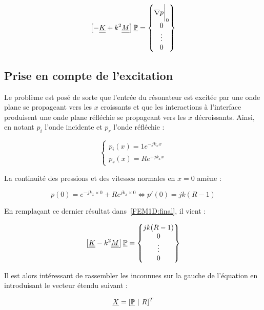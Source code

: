 \begin{equation}
\left[- \underline{\underline{K}} + k^2\underline{\underline{M}}\right]\underline{\mathbb{P}} = \begin{Bmatrix} \nabla p\bigg|_0\\0\\\vdots\\0\end{Bmatrix}
	\label{FEM1D:post_BCL}
\end{equation}

\subsection{Prise en compte de l'excitation}

Le problème est posé de sorte que l'entrée du résonateur est excitée par une onde plane se propageant vers les $x$
croissants et que les interactions à l'interface produisent une onde plane réfléchie se propageant vers les $x$
décroissants. Ainsi, en notant $p_i$ l'onde incidente et $p_r$ l'onde réfléchie :

\begin{equation}
	\left\{
	\begin{array}{l}
		p_i(x) = 1e^{-jk_xx}\\
		p_r(x) = Re^{+jk_xx}
	\end{array}
	\right.\label{FEM1D:expr_ondes}
\end{equation}

La continuité des pressions et des vitesses normales en $x=0$ amène :

\begin{equation*}
	p(0) = e^{-jk_x\times0}+Re^{jk_x\times0} \Leftrightarrow p'(0) = jk(R-1)
\end{equation*}

En remplaçant ce dernier résultat dans~\eqref{FEM1D:final}, il vient :

\begin{equation}
\left[\underline{\underline{K}} - k^2\underline{\underline{M}}\right]\underline{\mathbb{P}} = \begin{Bmatrix} jk(R-1)  \\0\\\vdots\\0\end{Bmatrix} \label{FEM1D:final}
\end{equation}

Il est alors intéressant de rassembler les inconnues sur la gauche de l'équation en introduisant le vecteur étendu
suivant :

\begin{equation*}
	\underline{X} = [\underline{\mathbb{P}} ~|~ R]^T
\end{equation*}

